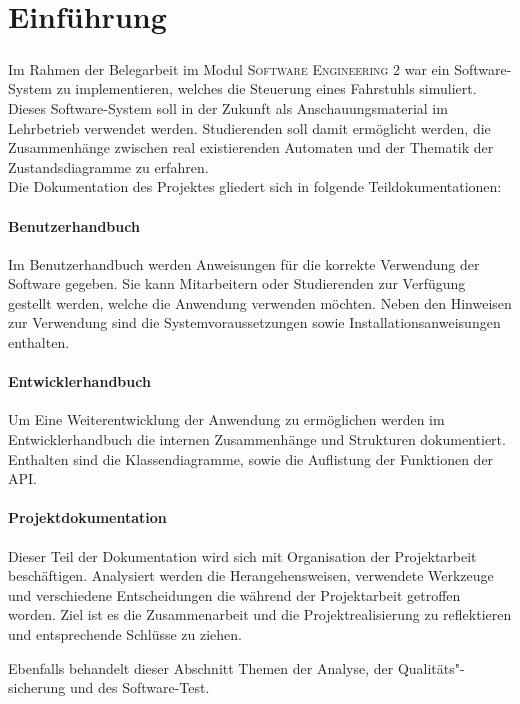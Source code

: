 \chapter{Einführung}
\paragraph{}
Im Rahmen der Belegarbeit im Modul \textsc{Software Engineering 2} war ein Software-System zu implementieren, welches die Steuerung eines Fahrstuhls simuliert. Dieses Software-System soll in der Zukunft als Anschauungsmaterial im Lehrbetrieb verwendet werden. Studierenden soll damit ermöglicht werden, die Zusammenhänge zwischen real existierenden Automaten und der Thematik der Zustandsdiagramme zu erfahren.
\\
Die Dokumentation des Projektes gliedert sich in folgende Teildokumentationen:
\subsubsection*{Benutzerhandbuch}
Im Benutzerhandbuch werden Anweisungen für die korrekte Verwendung der Software gegeben. Sie kann Mitarbeitern oder Studierenden zur Verfügung gestellt werden, welche die Anwendung verwenden möchten. Neben den Hinweisen zur Verwendung sind die Systemvoraussetzungen sowie Installationsanweisungen enthalten.

\subsubsection*{Entwicklerhandbuch}
Um Eine Weiterentwicklung der Anwendung zu ermöglichen werden im Entwicklerhandbuch die internen Zusammenhänge und Strukturen dokumentiert. Enthalten sind die Klassendiagramme, sowie die Auflistung der Funktionen der \acrshort{API}.\\

\subsubsection*{Projektdokumentation}
Dieser Teil der Dokumentation wird sich mit Organisation der Projektarbeit beschäftigen. Analysiert werden die Herangehensweisen, verwendete Werkzeuge und verschiedene Entscheidungen die während der Projektarbeit getroffen worden. Ziel ist es die Zusammenarbeit und die Projektrealisierung zu reflektieren und entsprechende Schlüsse zu ziehen.

Ebenfalls behandelt dieser Abschnitt Themen der Analyse, der Qualitäts"-sicherung und des Software-Test.

